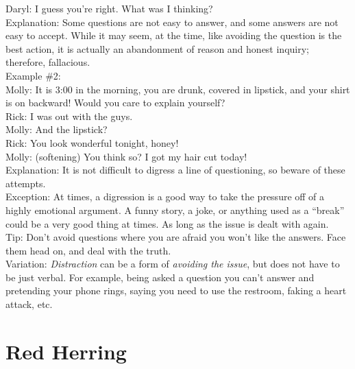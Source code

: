 \documentclass[a4paper,12pt,single,pdftex]{scrartcl}
\begin{document}
{      
        Daryl:  I guess you’re right.  What was I thinking?
      \\

      
        Explanation: Some questions are not easy to answer, and some answers are not easy to accept.  While it may seem, at the time, like avoiding the question is the best action, it is actually an abandonment of reason and honest inquiry; therefore, fallacious.
      \\

      
        Example \#2:
      \\

      
        Molly: It is 3:00 in the morning, you are drunk, covered in lipstick, and your shirt is on backward!  Would you care to explain yourself?
      \\

      
        Rick: I was out with the guys.
      \\

      
        Molly: And the lipstick?
      \\

      
        Rick: You look wonderful tonight, honey!
      \\

      
        Molly: (softening) You think so?  I got my hair cut today!
      \\

      
        Explanation: It is not difficult to digress a line of questioning, so beware of these attempts.
      \\

      
        Exception: At times, a digression is a good way to take the pressure off of a highly emotional argument.  A funny story, a joke,  or anything used as a “break” could be a very good thing at times.  As long as the issue is dealt with again.
      \\

      
        Tip: Don’t avoid questions where you are afraid you won’t like the answers.  Face them head on, and deal with the truth.
      \\

      
        Variation: {\it Distraction} can be a form of {\it avoiding the issue}, but does not have to be just verbal.  For example, being asked a question you can’t answer and pretending your phone rings, saying you need to use the restroom, faking a heart attack, etc.
      \\

    
    \section{
      Red Herring
    }
  
}
\end{document}
